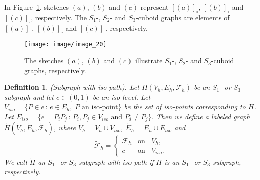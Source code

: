 \documentclass[a4paper,11pt]{article}
\newtheorem{definition}[theorem]{Definition}
\begin{document}
In Figure~\ref{image_20}, sketches $(a)$, $(b)$ and $(c)$ represent $[(a)]_{\circ}$,
$[(b)]_{\circ}$ and $[(c)]_{\square}$, respectively. The $S_1$-, $S_2$- and $S_3$-cuboid graphs
are elements of $[(a)]_{\circ}$, $[(b)]_{\circ}$ and $[(c)]_{\square}$, respectively.
\begin{figure}[!ht]
\texttt{[image: image/image\_20]}
\caption{The sketches $(a)$, $(b)$ and $(c)$ illustrate $S_1$-, $S_2$- and  $S_3$-cuboid graphs,
respectively.}
\label{image_20}
\end{figure}
\FloatBarrier
\begin{definition}(Subgraph with iso-path).
Let $H(V_h,E_h,\mathcal{F}_h)$ be an $S_1$- or $S_3$-subgraph and let $c\in (0,1)$ be an iso-level.
Let $V_{iso}=\{P\in e\,:\,e\in E_h,\; P\mbox{ an iso-point}\}$ be the set of iso-points
corresponding to $H$. Let $E_{iso}=\{e=\overline{P_iP_j}\,:\,P_i,P_j\in V_{iso}\mbox{ and } P_i\neq P_j\}$.
Then we define a labeled graph $\tilde{H}(\tilde{V}_h,\tilde{E}_h,\tilde{\mathcal{F}}_h)$, where
$\tilde{V}_h=V_h\cup V_{iso}$, $\tilde{E}_h=E_h\cup E_{iso}$ and
\begin{equation}
 \tilde{\mathcal{F}}_h=\left\{
   \begin{array}{ll}
     \mathcal{F}_h & \mbox{on }\;\; V_h, \\
     c & \mbox{on }\;\; V_{iso}.
   \end{array}\right.
\label{eq:iso-path-5}
\end{equation}
We call $\tilde{H}$ an $S_1$- or $S_3$-subgraph with iso-path if $H$ is an $S_1$- or $S_3$-subgraph,
respectively.
\label{def:iso-path-13}
\end{definition}
\end{document}
